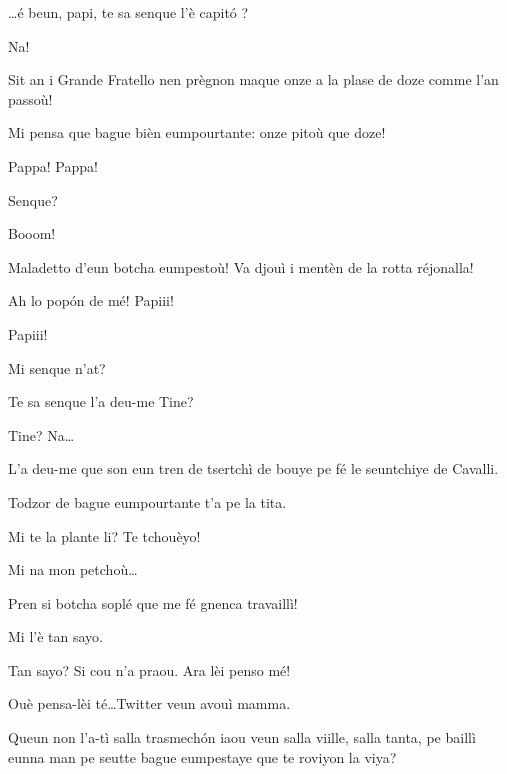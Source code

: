 \begin{drama}
\Alicespeaks{} \ldots é beun, papi, te sa senque l'è capit\'o ? 

\Tanteunspeaks Na!

\Alicespeaks Sit an i Grande Fratello nen prègnon maque onze a la plase de doze comme l’an passoù!

\Tanteunspeaks{} Mi pensa que bague bièn eumpourtante: onze pitoù que doze!

\Twitterspeaks Pappa! Pappa!

\Tanteunspeaks Senque?


\Twitterspeaks Booom!

\Tanteunspeaks{} Maladetto d'eun botcha eumpestoù! Va djouì i mentèn de la rotta réjonalla!

\Alicespeaks{} Ah lo pop\'on de mé! Papiii!


\Alicespeaks Papiii!

\Tanteunspeaks Mi senque n'at?

\Alicespeaks Te sa senque l'a deu-me Tine?

\Tanteunspeaks Tine? Na\ldots

\Alicespeaks L'a deu-me que son eun tren de tsertchì de bouye pe fé le seun\-tchiye de Cavalli. 

\Tanteunspeaks{} Todzor de bague eumpourtante t'a pe la tita.


\Tanteunspeaks Mi te la plante li? Te tchouèyo!

\Alicespeaks Mi na mon petchoù\ldots

\Tanteunspeaks{} Pren si botcha soplé que me fé gnenca travaillì!

\Alicespeaks Mi l'è tan sayo.

\Tanteunspeaks Tan sayo? Si cou n'a praou. Ara lèi penso mé!


\Alicespeaks Ouè pensa-lèi té\ldots Twitter veun avouì mamma.

\Tanteunspeaks Queun non l'a-tì salla trasmech\'on iaou veun salla viille, salla tanta, pe baillì eunna man pe seutte  bague eumpestaye que te roviyon la viya?


\end{drama}
